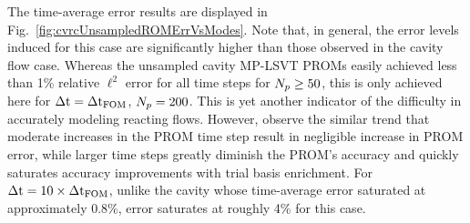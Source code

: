 The time-average error results are displayed in Fig.~\ref{fig:cvrcUnsampledROMErrVsModes}. Note that, in general, the error levels induced for this case are significantly higher than those observed in the cavity flow case. Whereas the unsampled cavity MP-LSVT PROMs easily achieved less than 1\% relative $\ell^2$ error for all time steps for $N_p \ge 50$, this is only achieved here for $\Delta \text{t} = \Delta \text{t}_{\text{FOM}}$, $N_p = 200$. This is yet another indicator of the difficulty in accurately modeling reacting flows. However, observe the similar trend that moderate increases in the PROM time step result in negligible increase in PROM error, while larger time steps greatly diminish the PROM's accuracy and quickly saturates accuracy improvements with trial basis enrichment. For $\Delta \text{t} = 10 \times \Delta \text{t}_{\text{FOM}}$, unlike the cavity whose time-average error saturated at approximately 0.8\%, error saturates at roughly 4\% for this case.

